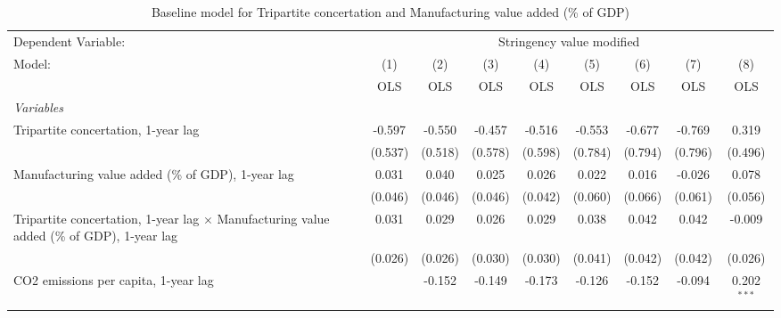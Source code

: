 
\begin{table}[htbp]
   \caption{Baseline model for Tripartite concertation and Manufacturing value added (\% of GDP)}
   \centering
   \begin{tabular}{lcccccccc}
      \toprule
      Dependent Variable: & \multicolumn{8}{c}{Stringency value modified}\\
      Model:                                                                                           & (1)     & (2)     & (3)         & (4)          & (5)           & (6)           & (7)          & (8)\\  
                                                                                                       &  OLS    & OLS     & OLS         & OLS          & OLS           & OLS           & OLS          & OLS\\  
      \midrule
      \emph{Variables}\\
      Tripartite concertation, 1-year lag                                                              & -0.597  & -0.550  & -0.457      & -0.516       & -0.553        & -0.677        & -0.769       & 0.319\\   
                                                                                                       & (0.537) & (0.518) & (0.578)     & (0.598)      & (0.784)       & (0.794)       & (0.796)      & (0.496)\\   
      Manufacturing value added (\% of GDP), 1-year lag                                                & 0.031   & 0.040   & 0.025       & 0.026        & 0.022         & 0.016         & -0.026       & 0.078\\   
                                                                                                       & (0.046) & (0.046) & (0.046)     & (0.042)      & (0.060)       & (0.066)       & (0.061)      & (0.056)\\   
      Tripartite concertation, 1-year lag $\times$ Manufacturing value added (\% of GDP), 1-year lag   & 0.031   & 0.029   & 0.026       & 0.029        & 0.038         & 0.042         & 0.042        & -0.009\\   
                                                                                                       & (0.026) & (0.026) & (0.030)     & (0.030)      & (0.041)       & (0.042)       & (0.042)      & (0.026)\\   
      CO2 emissions per capita, 1-year lag                                                             &         & -0.152  & -0.149      & -0.173       & -0.126        & -0.152        & -0.094       & 0.202$^{***}$\\   

\end{tabular}
\end{table}

